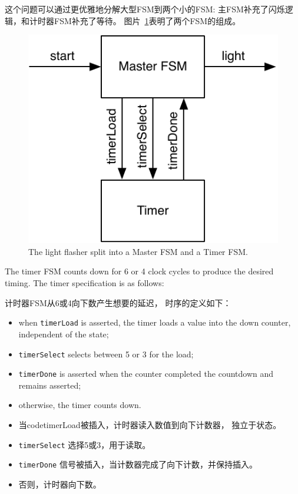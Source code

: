 \documentclass[%
    10pt,
    headinclude, footexclude,
    openright, %
    notitlepage,
    cleardoubleempty,
    headsepline,
    pointlessnumbers,
    bibtotoc, idxtotoc,
    ]{scrbook}
\newcommand{\code}[1]{{\small{\texttt{#1}}}}
\newcommand{\scale}{0.7}
\begin{document}
这个问题可以通过更优雅地分解大型FSM到两个小的FSM: 主FSM补充了闪烁逻辑，和计时器FSM补充了等待。
图片~\ref{fig:flasher}表明了两个FSM的组成。

\begin{figure}
  \centering
  \includegraphics[scale=\scale]{figures/flasher}
  \caption{The light flasher split into a Master FSM and a Timer FSM.}
  \label{fig:flasher}
\end{figure}

The timer FSM counts down for 6 or 4 clock cycles to produce the desired timing.
The timer specification is as follows:

计时器FSM从6或4向下数产生想要的延迟，
时序的定义如下：

\begin{itemize}
\item when \code{timerLoad} is asserted, the timer loads a value into the down counter,
independent of the state;
\item \code{timerSelect} selects between 5 or 3 for the load;
\item \code{timerDone} is asserted when the counter completed the countdown
and remains asserted;
\item otherwise, the timer counts down.
\end{itemize}

\begin{itemize}
\item 当code{timerLoad}被插入，计时器读入数值到向下计数器，
独立于状态。
\item \code{timerSelect} 选择5或3，用于读取。
\item \code{timerDone} 信号被插入，当计数器完成了向下计数，并保持插入。
\item 否则，计时器向下数。
\end{itemize}
\end{document}
